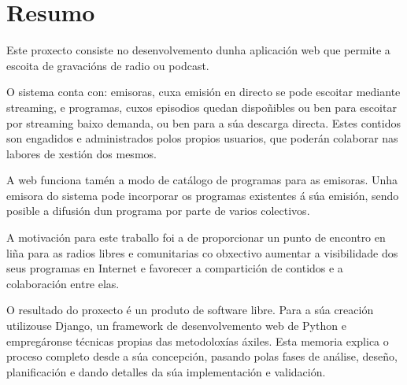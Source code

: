 \thispagestyle{plain}
\section*{Resumo}

Este proxecto consiste no desenvolvemento dunha aplicación web que permite a escoita de gravacións de radio ou podcast.

O sistema conta con: emisoras, cuxa emisión en directo se pode escoitar mediante streaming, e programas, cuxos episodios quedan dispoñibles ou ben para escoitar por streaming baixo demanda, ou ben para a súa descarga directa. Estes contidos son engadidos e administrados polos propios usuarios, que poderán colaborar nas labores de xestión dos mesmos.

A web funciona tamén a modo de catálogo de programas para as emisoras. Unha emisora do sistema pode incorporar os programas existentes á súa emisión, sendo posible a difusión dun programa por parte de varios colectivos. 

A motivación para este traballo foi a de proporcionar un punto de encontro en liña para as radios libres e comunitarias co obxectivo aumentar a visibilidade dos seus programas en Internet e favorecer a compartición de contidos e a colaboración entre elas.

O resultado do proxecto é un produto de software libre. Para a súa creación utilizouse Django, un framework de desenvolvemento web de Python e empregáronse técnicas propias das metodoloxías áxiles. Esta memoria explica o proceso completo desde a súa concepción, pasando polas fases de análise, deseño, planificación e dando detalles da súa implementación e validación.




   
